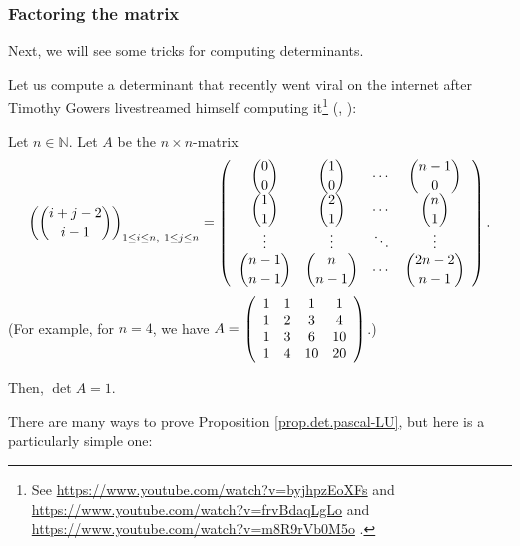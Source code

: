 \subsubsection{Factoring the matrix}

Next, we will see some tricks for computing determinants.

Let us compute a determinant that recently went viral on the internet after
Timothy Gowers livestreamed himself computing it\footnote{See
\url{https://www.youtube.com/watch?v=byjhpzEoXFs} and
\url{https://www.youtube.com/watch?v=frvBdaqLgLo} and
\url{https://www.youtube.com/watch?v=m8R9rVb0M5o} .} (\cite[Exercise
6.11]{detnotes}, \cite{EdelStrang}):

\begin{proposition}
\label{prop.det.pascal-LU}Let $n\in\mathbb{N}$. Let $A$ be the $n\times
n$-matrix%
\[
\left(  \dbinom{i+j-2}{i-1}\right)  _{1\leq i\leq n,\ 1\leq j\leq n}=\left(
\begin{array}
[c]{cccc}%
\dbinom{0}{0} & \dbinom{1}{0} & \cdots & \dbinom{n-1}{0}\\
\dbinom{1}{1} & \dbinom{2}{1} & \cdots & \dbinom{n}{1}\\
\vdots & \vdots & \ddots & \vdots\\
\dbinom{n-1}{n-1} & \dbinom{n}{n-1} & \cdots & \dbinom{2n-2}{n-1}%
\end{array}
\right)  .
\]
(For example, for $n=4$, we have $A=\left(
\begin{array}
[c]{cccc}%
1 & 1 & 1 & 1\\
1 & 2 & 3 & 4\\
1 & 3 & 6 & 10\\
1 & 4 & 10 & 20
\end{array}
\right)  $.)

Then, $\det A=1$.
\end{proposition}

There are many ways to prove Proposition \ref{prop.det.pascal-LU}, but here is
a particularly simple one:

